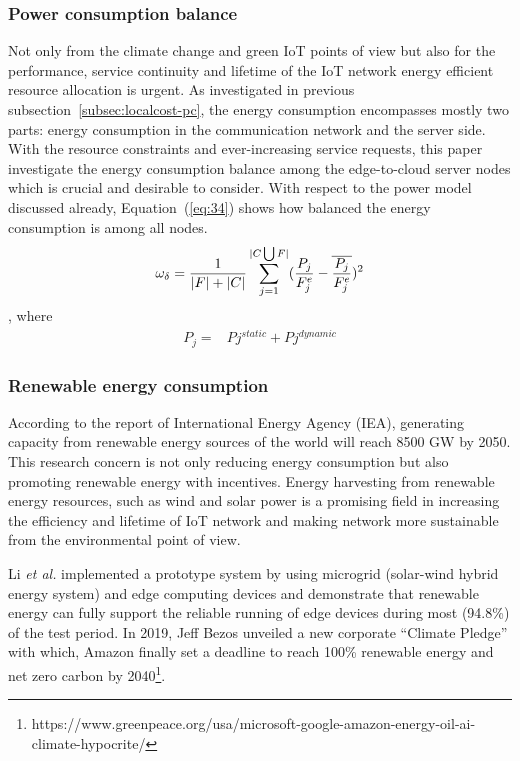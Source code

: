 \documentclass[twocolumn]{article}
\begin{document}
\subsubsection{Power consumption balance}
\par Not only from the climate change and green IoT points of view but also for the performance, service continuity and lifetime of the IoT network energy efficient resource allocation is urgent. As investigated in previous subsection~\ref{subsec:localcost-pc}, the energy consumption encompasses mostly two parts: energy consumption in the communication network and the server side. With the resource constraints and ever-increasing service requests, this paper investigate the energy consumption balance among the edge-to-cloud server nodes which is crucial and desirable to consider\cite{deng2016optimal,hassan2020priority}.
With respect to the power model discussed already, Equation~(\ref{eq:34}) shows how balanced the energy consumption is among all nodes.
\begin{equation}
\omega_{\delta}=\frac{1}{|F|+|C|}
\sum_{j=1}^{|{C}\bigcup{F}|}(\frac{P_{j}}{F^{e}_{j}}-\overline{\frac{P_{j}}{F^{e}_{j}}})^{2}
\label{eq:34}\\
\end{equation}
, where
\begin{equation}
\begin{aligned}
P_{j} = &P {j}^{static} + P {j}^{dynamic}
\end{aligned}
\label{eq:35}
\end{equation}

\subsubsection{Renewable energy consumption}
\par According to the report of International Energy Agency (IEA), generating capacity from renewable energy sources of the world will reach 8500 GW by 2050. This research concern is not only reducing energy consumption but also promoting renewable energy with incentives. Energy harvesting from renewable energy resources, such as wind and solar power is a promising field in increasing the efficiency and lifetime of IoT network and making network more sustainable from the environmental point of view\cite{lee2015powering}.
\par Li \textit{et al.}\cite{li2018enabling} implemented a prototype system by using microgrid (solar-wind hybrid energy system) and edge computing devices and demonstrate that renewable energy can fully support the reliable running of edge devices during most (94.8\%) of the test period. In 2019, Jeff Bezos unveiled a new corporate “Climate Pledge” with which, Amazon finally set a deadline to reach 100\% renewable energy and net zero carbon by 2040\footnote{https://www.greenpeace.org/usa/microsoft-google-amazon-energy-oil-ai-climate-hypocrite/}. 
\end{document}
